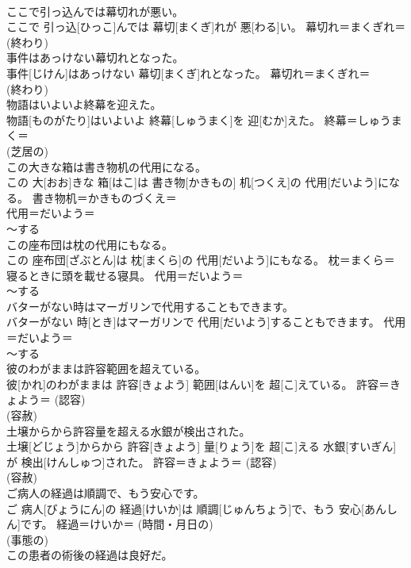 \documentclass[8pt]{extreport}
\begin{document}
\begin{CJK}{UTF8}{min}
{\\	ここで引っ込んでは幕切れが悪い。	
\\	ここで 引っ込[ひっこ]んでは 幕切[まくぎ]れが 悪[わる]い。	幕切れ＝まくぎれ＝ 
\\	(終わり) 
\\	事件はあっけない幕切れとなった。	
\\	事件[じけん]はあっけない 幕切[まくぎ]れとなった。	幕切れ＝まくぎれ＝ 
\\	(終わり) 
\\	物語はいよいよ終幕を迎えた。	
\\	物語[ものがたり]はいよいよ 終幕[しゅうまく]を 迎[むか]えた。	終幕＝しゅうまく＝ 
\\	(芝居の) 
\\	この大きな箱は書き物机の代用になる。	
\\	この 大[おお]きな 箱[はこ]は 書き物[かきもの] 机[つくえ]の 代用[だいよう]になる。	書き物机＝かきものづくえ＝ 
\\	代用＝だいよう＝ 
\\	〜する 
\\	この座布団は枕の代用にもなる。	
\\	この 座布団[ざぶとん]は 枕[まくら]の 代用[だいよう]にもなる。	枕＝まくら＝　寝るときに頭を載せる寝具。 代用＝だいよう＝ 
\\	〜する 
\\	バターがない時はマーガリンで代用することもできます。	
\\	バターがない 時[とき]はマーガリンで 代用[だいよう]することもできます。	代用＝だいよう＝ 
\\	〜する 
\\	彼のわがままは許容範囲を超えている。	
\\	彼[かれ]のわがままは 許容[きょよう] 範囲[はんい]を 超[こ]えている。	許容＝きょよう＝ (認容) 
\\	(容赦) 
\\	土壌からから許容量を超える水銀が検出された。	
\\	土壌[どじょう]からから 許容[きょよう] 量[りょう]を 超[こ]える 水銀[すいぎん]が 検出[けんしゅつ]された。	許容＝きょよう＝ (認容) 
\\	(容赦) 
\\	ご病人の経過は順調で、もう安心です。	
\\	ご 病人[びょうにん]の 経過[けいか]は 順調[じゅんちょう]で、もう 安心[あんしん]です。	経過＝けいか＝ (時間・月日の) 
\\	(事態の) 
\\	この患者の術後の経過は良好だ。	
}
\end{CJK}
\end{document}
